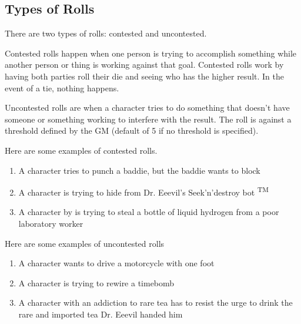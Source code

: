 \begin{flushleft}
\section*{Types of Rolls} \label{roll_types}

There are two types of rolls: contested and uncontested.

Contested rolls happen when one person is trying to accomplish something while
another person or thing is working against that goal. Contested rolls work by
having both parties roll their die and seeing who has the higher result. In
the event of a tie, nothing happens.

Uncontested rolls are when a character tries to do something that doesn't have
someone or something working to interfere with the result. The roll is against
a threshold defined by the GM (default of 5 if no threshold is specified).

Here are some examples of contested rolls.

\begin{enumerate}

    \item{A character tries to punch a baddie, but the baddie wants to block}
    \item{A character is trying to hide from Dr. Eeevil's Seek'n'destroy bot
          \textsuperscript{TM}}
    \item{A character by is trying to steal a bottle of liquid hydrogen from
          a poor laboratory worker}

\end{enumerate}

Here are some examples of uncontested rolls

\begin{enumerate}

    \item{A character wants to drive a motorcycle with one foot}
    \item{A character is trying to rewire a timebomb}
    \item{A character with an addiction to rare tea has to resist the urge to
          drink the rare and imported tea Dr. Eeevil handed him}

\end{enumerate}


\end{flushleft}
